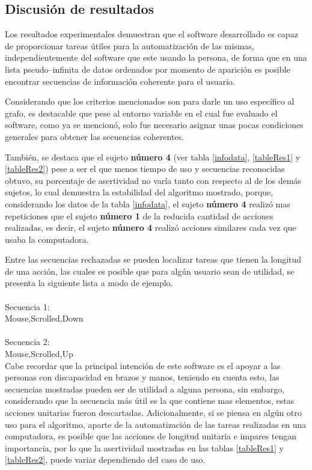 \subsection{Discusi\'{o}n de resultados}


Los resultados experimentales demuestran que el software desarrollado es capaz
 de proporcionar tareas \'utiles para la automatizaci\'on de las mismas,
 independientemente del software que este usando la persona, de forma que en 
 una lista pseudo--infinita de datos ordenados por momento de aparici\'on es
 posible encontrar secuencias de informaci\'on coherente para el usuario.


Considerando que los criterios mencionados son para darle un uso espec\'ifico
 al grafo, es destacable que pese al entorno variable en el cual fue evaluado
 el software, como ya se mencion\'o, solo fue necesario asignar unas pocas
 condiciones generales para obtener las secuencias coherentes.
 
 
Tambi\'en, se destaca que el sujeto \textbf{n\'umero 4} (ver tabla 
 \ref{infodata}, \ref{tableRes1} y \ref{tableRes2}) pese a ser el que menos
 tiempo de uso y secuencias reconocidas obtuvo, su porcentaje de asertividad no
 var\'ia tanto con respecto al de los dem\'as sujetos, lo cual demuestra la 
 estabilidad del algoritmo mostrado, porque, considerando los datos de la tabla 
 \ref{infodata}, el sujeto \textbf{n\'umero 4} realiz\'o mas repeticiones que el 
 sujeto \textbf{n\'umero 1} de la reducida cantidad de acciones realizadas, es 
 decir, el sujeto \textbf{n\'umero 4} realiz\'o acciones similares cada vez que 
 usaba la computadora.


Entre las secuencias rechazadas se pueden localizar tareas que tienen la
 longitud de una acci\'on, las cuales es posible que para alg\'un usuario sean
 de utilidad, se presenta la siguiente lista a modo de ejemplo.
\\
\\
Secuencia 1:\\
Mouse,Scrolled,Down\\
\\
Secuencia 2:\\
Mouse,Scrolled,Up\\

Cabe recordar que la principal intenci\'on de este software es el apoyar a las
 personas con discapacidad en brazos y manos, teniendo en cuenta esto, las
 secuencias mostradas pueden ser de utilidad a alguna persona, sin embargo,
 considerando que la secuencia m\'as \'util es la que contiene mas elementos,
 estas acciones unitarias fueron descartadas. Adicionalmente, si se piensa en
 alg\'un otro uso para el algoritmo, aparte de la automatizaci\'on de las
 tareas realizadas en una computadora, es posible que las acciones de longitud
 unitaria e impares tengan importancia, por lo que la asertividad mostradas en
 las tablas \ref{tableRes1} y \ref{tableRes2}, puede variar dependiendo del
 caso de uso.

